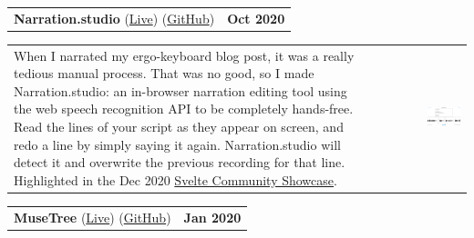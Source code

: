 \documentclass[hidelinks, 12pt, a4paper]{article}
\begin{document}
	\vspace{24pt}
	
	\begin{tabularx}{\linewidth}{X r}
		\textbf{Narration.studio} (\href{https://narration.studio/}{Live}) (\href{https://github.com/stevenwaterman/narration.studio/}{GitHub}) & \textbf{Oct 2020}
	\end{tabularx}\vspace{2pt}

	\hspace{0.05\linewidth}\begin{tabularx}{0.95\linewidth}{Xr}
		\begin{minipage}{\linewidth}
			When I narrated my ergo-keyboard blog post, it was a really tedious manual process.
			That was no good, so I made Narration.studio: an in-browser narration editing tool using the web speech recognition API to be completely hands-free.
			Read the lines of your script as they appear on screen, and redo a line by simply saying it again.
			Narration.studio will detect it and overwrite the previous recording for that line.
			Highlighted in the Dec 2020 \href{https://svelte.dev/blog/whats-new-in-svelte-december-2020}{Svelte Community Showcase}.
		\end{minipage} & \href{https://narration.studio/}{\includegraphics[align=c, width=0.36\textwidth]{narrationstudio}}
	\end{tabularx}
	
	\vspace{24pt}
	
	\begin{tabularx}{\linewidth}{X r}
		\textbf{MuseTree} (\href{https://stevenwaterman.uk/musetree/}{Live}) (\href{https://github.com/stevenwaterman/musetree}{GitHub}) & \textbf{Jan 2020}
	\end{tabularx}\vspace{2pt}
	
\end{document}
